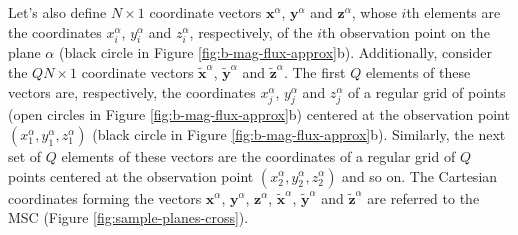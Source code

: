 \documentclass[draft,gc]{agutex}
\begin{document}
\begin{article}
Let's also define $N \times 1$ coordinate vectors $\mathbf{x}^{\alpha}$,
$\mathbf{y}^{\alpha}$ and $\mathbf{z}^{\alpha}$, whose
$i$th elements are the coordinates $x_{i}^{\alpha}$,
$y_{i}^{\alpha}$ and $z_{i}^{\alpha}$, respectively,
of the $i$th observation point on the plane $\alpha$
(black circle in Figure \ref{fig:b-mag-flux-approx}b).
Additionally, consider the $QN \times 1$ coordinate vectors 
$\tilde{\mathbf{x}}^{\alpha}$, $\tilde{\mathbf{y}}^{\alpha}$ and 
$\tilde{\mathbf{z}}^{\alpha}$. The first $Q$ elements of these
vectors are, respectively, the coordinates $x_{j}^{\alpha}$,
$y_{j}^{\alpha}$ and $z_{j}^{\alpha}$ of a regular grid of points
(open circles in Figure \ref{fig:b-mag-flux-approx}b) centered at 
the observation point $(x_{1}^{\alpha}, y_{1}^{\alpha}, z_{1}^{\alpha})$
(black circle in Figure \ref{fig:b-mag-flux-approx}b).
Similarly, the next set of $Q$ elements of these vectors are
the coordinates of a regular grid of $Q$ points centered
at the observation point $(x_{2}^{\alpha}, y_{2}^{\alpha}, z_{2}^{\alpha})$
and so on.
The Cartesian coordinates forming the vectors $\mathbf{x}^{\alpha}$,
$\mathbf{y}^{\alpha}$, $\mathbf{z}^{\alpha}$, 
$\tilde{\mathbf{x}}^{\alpha}$, $\tilde{\mathbf{y}}^{\alpha}$ and 
$\tilde{\mathbf{z}}^{\alpha}$ are referred to the MSC
(Figure \ref{fig:sample-planes-cross}).


\end{article}
\end{document}

